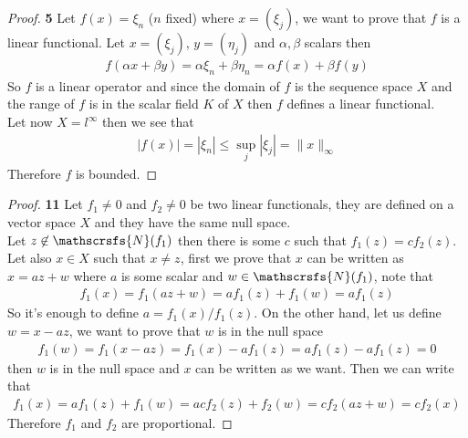 \documentclass[11pt]{article}
\newcommand{\nullsp}{\mathscrsfs{N}}
\theoremstyle{definition}
\begin{document}
\cleardoublepage
\begin{proof}{\textbf{5}}
    Let $f(x) = \xi_n$ ($n$ fixed) where $x = (\xi_j)$, we want to prove that
    $f$ is a linear functional.
    Let $x = (\xi_j)$, $y = (\eta_j)$ and $\alpha, \beta$ scalars then
    \begin{align*}
        f(\alpha x + \beta y) = \alpha \xi_n + \beta \eta_n
        = \alpha f(x) + \beta f(y)
    \end{align*}
    So $f$ is a linear operator and since the domain of $f$ is the sequence
    space $X$ and the range of $f$ is in the scalar field $K$ of $X$ then
    $f$ defines a linear functional.\\
    Let now $X = l^\infty$ then we see that
    \begin{align*}
        |f(x)| = |\xi_n| \leq \sup_j |\xi_j| = \|x\|_\infty
    \end{align*}
    Therefore $f$ is bounded.
\end{proof}
\begin{proof}{\textbf{11}}
    Let $f_1 \neq 0$ and $f_2 \neq 0$ be two linear functionals, they are
    defined on a vector space $X$ and they have the same null space.\\
    Let $z \not\in \nullsp(f_1)$ then there is some $c$ such that
    $f_1(z) = c f_2(z)$.\\
    Let also $x \in X$ such that $x \neq z$, first we prove that $x$ can be
    written as $x = az + w$ where $a$ is some scalar and
    $w \in \nullsp(f_1)$, note that
    \begin{align*}
        f_1(x) = f_1(az + w) = af_1(z) + f_1(w) = af_1(z)
    \end{align*}
    So it's enough to define $a = f_1(x)/f_1(z)$.
    On the other hand, let us define $w = x - az$, we want to prove that $w$
    is in the null space
    \begin{align*}
        f_1(w) = f_1(x - az) = f_1(x) - af_1(z) = af_1(z) - af_1(z) = 0
    \end{align*}
    then $w$ is in the null space and $x$ can be written as we want.
    Then we can write that
    \begin{align*}
        f_1(x) = af_1(z) + f_1(w) = acf_2(z) + f_2(w) = cf_2(az + w) = cf_2(x) 
    \end{align*}
    Therefore $f_1$ and $f_2$ are proportional.
\end{proof}
\cleardoublepage
\end{document}
